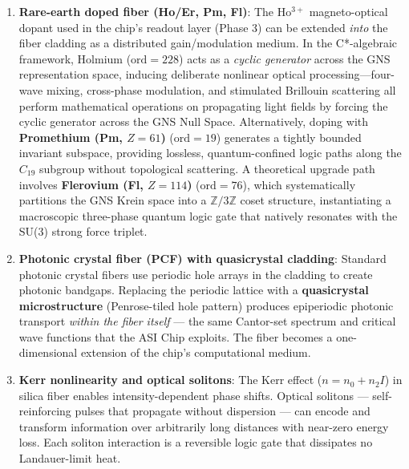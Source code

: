 \begin{enumerate}
    \item \textbf{Rare-earth doped fiber (Ho/Er, Pm, Fl)}: The Ho$^{3+}$ magneto-optical dopant used in the chip's readout layer (Phase 3) can be extended \emph{into} the fiber cladding as a distributed gain/modulation medium. In the C*-algebraic framework, Holmium ($\mathrm{ord}=228$) acts as a \emph{cyclic generator} across the GNS representation space, inducing deliberate nonlinear optical processing---four-wave mixing, cross-phase modulation, and stimulated Brillouin scattering all perform mathematical operations on propagating light fields by forcing the cyclic generator across the GNS Null Space. Alternatively, doping with \textbf{Promethium (Pm, $Z=61$)} ($\mathrm{ord}=19$) generates a tightly bounded invariant subspace, providing lossless, quantum-confined logic paths along the $C_{19}$ subgroup without topological scattering. A theoretical upgrade path involves \textbf{Flerovium (Fl, $Z=114$)} ($\mathrm{ord}=76$), which systematically partitions the GNS Krein space into a $\mathbb{Z}/3\mathbb{Z}$ coset structure, instantiating a macroscopic three-phase quantum logic gate that natively resonates with the SU(3) strong force triplet.
    
    \item \textbf{Photonic crystal fiber (PCF) with quasicrystal cladding}: Standard photonic crystal fibers use periodic hole arrays in the cladding to create photonic bandgaps. Replacing the periodic lattice with a \textbf{quasicrystal microstructure} (Penrose-tiled hole pattern) produces epiperiodic photonic transport \emph{within the fiber itself} --- the same Cantor-set spectrum and critical wave functions that the ASI Chip exploits. The fiber becomes a one-dimensional extension of the chip's computational medium.
    
    \item \textbf{Kerr nonlinearity and optical solitons}: The Kerr effect ($n = n_0 + n_2 I$) in silica fiber enables intensity-dependent phase shifts. Optical solitons --- self-reinforcing pulses that propagate without dispersion --- can encode and transform information over arbitrarily long distances with near-zero energy loss. Each soliton interaction is a reversible logic gate that dissipates no Landauer-limit heat.
\end{enumerate}

